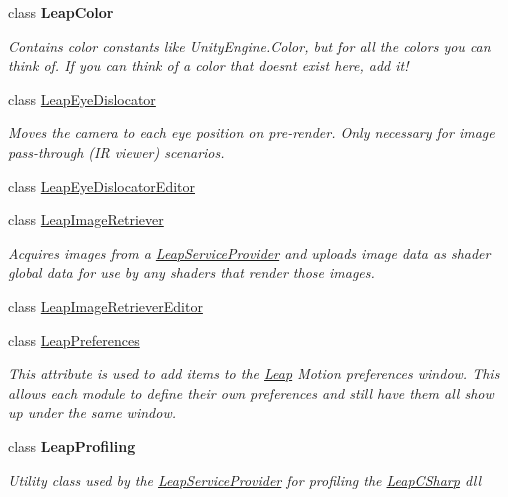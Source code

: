 \begin{DoxyCompactItemize}
\item 
class {\bfseries Leap\+Color}
\begin{DoxyCompactList}\small\item\em Contains color constants like Unity\+Engine.\+Color, but for {\itshape all} the colors you can think of. If you can think of a color that doesn\textquotesingle{}t exist here, add it! \end{DoxyCompactList}\item 
class \mbox{\hyperlink{class_leap_1_1_unity_1_1_leap_eye_dislocator}{Leap\+Eye\+Dislocator}}
\begin{DoxyCompactList}\small\item\em Moves the camera to each eye position on pre-\/render. Only necessary for image pass-\/through (IR viewer) scenarios. \end{DoxyCompactList}\item 
class \mbox{\hyperlink{class_leap_1_1_unity_1_1_leap_eye_dislocator_editor}{Leap\+Eye\+Dislocator\+Editor}}
\item 
class \mbox{\hyperlink{class_leap_1_1_unity_1_1_leap_image_retriever}{Leap\+Image\+Retriever}}
\begin{DoxyCompactList}\small\item\em Acquires images from a \mbox{\hyperlink{class_leap_1_1_unity_1_1_leap_service_provider}{Leap\+Service\+Provider}} and uploads image data as shader global data for use by any shaders that render those images. \end{DoxyCompactList}\item 
class \mbox{\hyperlink{class_leap_1_1_unity_1_1_leap_image_retriever_editor}{Leap\+Image\+Retriever\+Editor}}
\item 
class \mbox{\hyperlink{class_leap_1_1_unity_1_1_leap_preferences}{Leap\+Preferences}}
\begin{DoxyCompactList}\small\item\em This attribute is used to add items to the \mbox{\hyperlink{namespace_leap_1_1_unity_1_1_leap}{Leap}} Motion preferences window. This allows each module to define their own preferences and still have them all show up under the same window. \end{DoxyCompactList}\item 
class {\bfseries Leap\+Profiling}
\begin{DoxyCompactList}\small\item\em Utility class used by the \mbox{\hyperlink{class_leap_1_1_unity_1_1_leap_service_provider}{Leap\+Service\+Provider}} for profiling the \mbox{\hyperlink{namespace_leap_1_1_leap_c_sharp}{Leap\+C\+Sharp}} dll \end{DoxyCompactList}\item 

\end{DoxyCompactItemize}
